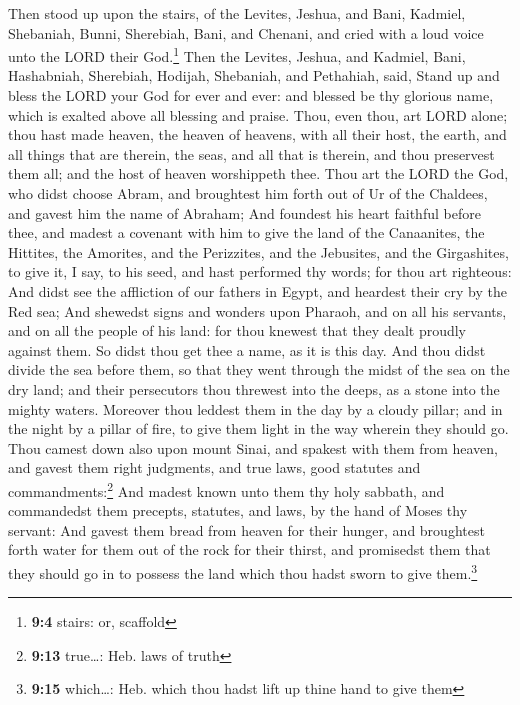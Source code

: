  Then stood up upon the stairs, of the Levites, Jeshua,
and Bani, Kadmiel, Shebaniah, Bunni, Sherebiah, Bani, and Chenani, and
cried with a loud voice unto the LORD their God.\footnote{\textbf{9:4}
  stairs: or, scaffold}  Then the Levites, Jeshua, and
Kadmiel, Bani, Hashabniah, Sherebiah, Hodijah, Shebaniah, and Pethahiah,
said, Stand up and bless the LORD your God for ever and ever: and
blessed be thy glorious name, which is exalted above all blessing and
praise.  Thou, even thou, art LORD alone; thou hast made
heaven, the heaven of heavens, with all their host, the earth, and all
things that are therein, the seas, and all that is therein, and thou
preservest them all; and the host of heaven worshippeth thee.
 Thou art the LORD the God, who didst choose Abram, and
broughtest him forth out of Ur of the Chaldees, and gavest him the name
of Abraham;  And foundest his heart faithful before thee,
and madest a covenant with him to give the land of the Canaanites, the
Hittites, the Amorites, and the Perizzites, and the Jebusites, and the
Girgashites, to give it, I say, to his seed, and hast performed thy
words; for thou art righteous:  And didst see the
affliction of our fathers in Egypt, and heardest their cry by the Red
sea;  And shewedst signs and wonders upon Pharaoh, and on
all his servants, and on all the people of his land: for thou knewest
that they dealt proudly against them. So didst thou get thee a name, as
it is this day.  And thou didst divide the sea before
them, so that they went through the midst of the sea on the dry land;
and their persecutors thou threwest into the deeps, as a stone into the
mighty waters.  Moreover thou leddest them in the day by
a cloudy pillar; and in the night by a pillar of fire, to give them
light in the way wherein they should go.  Thou camest
down also upon mount Sinai, and spakest with them from heaven, and
gavest them right judgments, and true laws, good statutes and
commandments:\footnote{\textbf{9:13} true\ldots: Heb. laws of truth}
 And madest known unto them thy holy sabbath, and
commandedst them precepts, statutes, and laws, by the hand of Moses thy
servant:  And gavest them bread from heaven for their
hunger, and broughtest forth water for them out of the rock for their
thirst, and promisedst them that they should go in to possess the land
which thou hadst sworn to give them.\footnote{\textbf{9:15} which\ldots:
  Heb. which thou hadst lift up thine hand to give them} 
